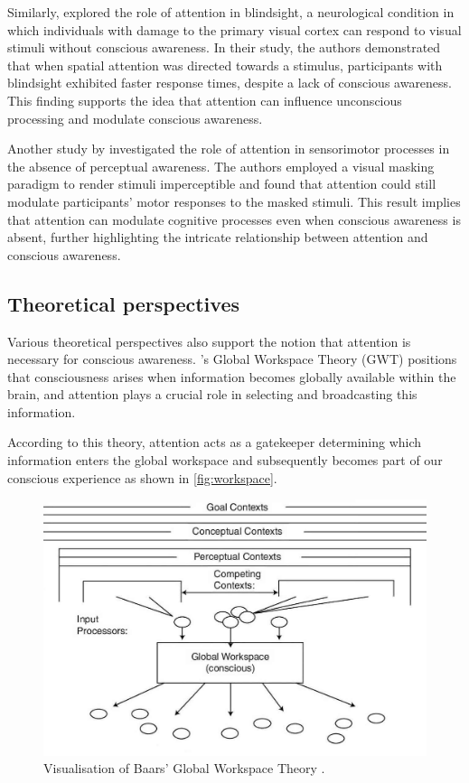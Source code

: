 \documentclass[10pt]{article}
\begin{document}
\begin{sloppypar}
  Similarly, \cite{kentridge_spatial_2004} explored the role of attention in blindsight, a neurological condition in which individuals with damage to the primary visual cortex can respond to visual stimuli without conscious awareness. In their study, the authors demonstrated that when spatial attention was directed towards a stimulus, participants with blindsight exhibited faster response times, despite a lack of conscious awareness. This finding supports the idea that attention can influence unconscious processing and modulate conscious awareness.

  Another study by \cite{sumner_attentional_2006} investigated the role of attention in sensorimotor processes in the absence of perceptual awareness. The authors employed a visual masking paradigm to render stimuli imperceptible and found that attention could still modulate participants’ motor responses to the masked stimuli. This result implies that attention can modulate cognitive processes even when conscious awareness is absent, further highlighting the intricate relationship between attention and conscious awareness.

  \subsection{Theoretical perspectives}
  \label{sec:theoretical}

  Various theoretical perspectives also support the notion that attention is necessary for conscious awareness. \cite{baars_essential_1997} ’s Global Workspace Theory (GWT) positions that consciousness arises when information becomes globally available within the brain, and attention plays a crucial role in selecting and broadcasting this information.

  According to this theory, attention acts as a gatekeeper determining which information enters the global workspace and subsequently becomes part of our conscious experience as shown in \autoref{fig:workspace}.

  \begin{figure}[ht]
    \centering
    \includegraphics[width=\textwidth]{figures/global-workspace.jpg}
    \caption[Visualisation of Baars’ Global Workspace Theory.]{Visualisation of Baars’ Global Workspace Theory \citep{sun_computational_2007}.}
    \label{fig:workspace}
  \end{figure}


\end{sloppypar}
\end{document}
